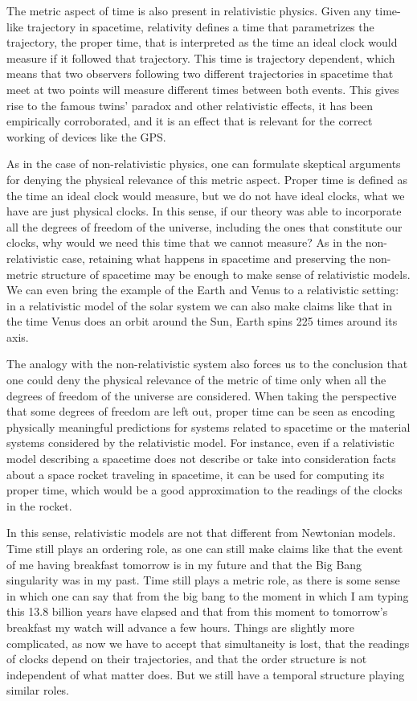 \documentclass[12 pt]{article}
\begin{document}
The metric aspect of time is also present in relativistic physics. Given any time-like trajectory in spacetime, relativity defines a time that parametrizes the trajectory, the proper time, that is interpreted as the time an ideal clock would measure if it followed that trajectory. This time is trajectory dependent, which means that two observers following two different trajectories in spacetime that meet at two points will measure different times between both events. This gives rise to the famous twins' paradox and other relativistic effects, it has been empirically corroborated, and it is an effect that is relevant for the correct working of devices like the GPS.

As in the case of non-relativistic physics, one can formulate skeptical arguments for denying the physical relevance of this metric aspect. Proper time is defined as the time an ideal clock would measure, but we do not have ideal clocks, what we have are just physical clocks. In this sense, if our theory was able to incorporate all the degrees of freedom of the universe, including the ones that constitute our clocks, why would we need this time that we cannot measure? As in the non-relativistic case, retaining what happens in spacetime and preserving the non-metric structure of spacetime may be enough to make sense of relativistic models. We can even bring the example of the Earth and Venus to a relativistic setting: in a relativistic model of the solar system we can also make claims like that in the time Venus does an orbit around the Sun, Earth spins 225 times around its axis.

The analogy with the non-relativistic system also forces us to the conclusion that one could deny the physical relevance of the metric of time only when all the degrees of freedom of the universe are considered. When taking the perspective that some degrees of freedom are left out, proper time can be seen as encoding physically meaningful predictions for systems related to spacetime or the material systems considered by the relativistic model. For instance, even if a relativistic model describing a spacetime does not describe or take into consideration facts about a space rocket traveling in spacetime, it can be used for computing its proper time, which would be a good approximation to the readings of the clocks in the rocket.

In this sense, relativistic models are not that different from Newtonian models. Time still plays an ordering role, as one can still make claims like that the event of me having breakfast tomorrow is in my future and that the Big Bang singularity was in my past. Time still plays a metric role, as there is some sense in which one can say that from the big bang to the moment in which I am typing this 13.8 billion years have elapsed and that from this moment to tomorrow's breakfast my watch will advance a few hours. Things are slightly more complicated, as now we have to accept that simultaneity is lost, that the readings of clocks depend on their trajectories, and that the order structure is not independent of what matter does. But we still have a temporal structure playing similar roles.
\end{document}
